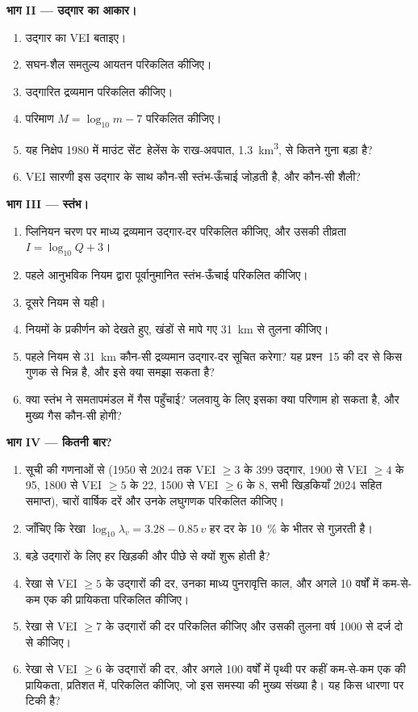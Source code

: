 \begin{problem}
\noindent\textbf{भाग II --- उद्गार का आकार।}
\begin{enumerate}[resume]
\item उद्गार का VEI बताइए।
\item सघन-शैल समतुल्य आयतन परिकलित कीजिए।
\item उद्गारित द्रव्यमान परिकलित कीजिए।
\item परिमाण $M = \log_{10}m - 7$ परिकलित कीजिए।
\item यह निक्षेप 1980 में माउंट सेंट~हेलेंस के राख-अवपात,
\qty{1.3}{km^3}, से कितने गुना बड़ा है?
\item VEI सारणी इस उद्गार के साथ कौन-सी स्तंभ-ऊँचाई जोड़ती है, और
कौन-सी शैली?
\end{enumerate}

\noindent\textbf{भाग III --- स्तंभ।}
\begin{enumerate}[resume]
\item प्लिनियन चरण पर माध्य द्रव्यमान उद्गार-दर परिकलित कीजिए, और उसकी
तीव्रता $I = \log_{10}Q + 3$।
\item पहले आनुभविक नियम द्वारा पूर्वानुमानित स्तंभ-ऊँचाई परिकलित कीजिए।
\item दूसरे नियम से यही।
\item नियमों के प्रकीर्णन को देखते हुए, खंडों से मापे गए \qty{31}{km} से
तुलना कीजिए।
\item पहले नियम से \qty{31}{km} कौन-सी द्रव्यमान उद्गार-दर सूचित करेगा? यह प्रश्न~15 की दर से
किस गुणक से भिन्न है, और इसे क्या समझा सकता है?
\item क्या स्तंभ ने समतापमंडल में गैस पहुँचाई? जलवायु के लिए इसका क्या परिणाम
हो सकता है, और मुख्य गैस कौन-सी होगी?
\end{enumerate}

\noindent\textbf{भाग IV --- कितनी बार?}
\begin{enumerate}[resume]
\item सूची की गणनाओं से (1950 से
2024 तक VEI $\ge 3$ के 399 उद्गार, 1900 से VEI $\ge 4$ के 95, 1800 से VEI $\ge 5$ के 22,
1500 से VEI $\ge 6$ के 8, सभी खिड़कियाँ 2024 सहित समाप्त), चारों वार्षिक दरें और
उनके लघुगणक परिकलित कीजिए।
\item जाँचिए कि रेखा $\log_{10}\lambda_v = 3.28 - 0.85\,v$ हर दर के
\qty{10}{\percent} के भीतर से गुज़रती है।
\item बड़े उद्गारों के लिए हर खिड़की और पीछे से क्यों शुरू होती है?
\item रेखा से VEI $\ge 5$ के उद्गारों की दर, उनका माध्य
पुनरावृत्ति काल, और अगले 10 वर्षों में कम-से-कम एक की प्रायिकता परिकलित कीजिए।
\item रेखा से VEI $\ge 7$ के उद्गारों की दर परिकलित कीजिए और उसकी तुलना
वर्ष 1000 से दर्ज दो से कीजिए।
\item रेखा से VEI $\ge 6$ के उद्गारों की दर, और अगले 100
वर्षों में पृथ्वी पर कहीं कम-से-कम एक की प्रायिकता, प्रतिशत में, परिकलित कीजिए, जो इस
समस्या की मुख्य संख्या है। यह किस धारणा पर टिकी है?
\end{enumerate}
\end{problem}
